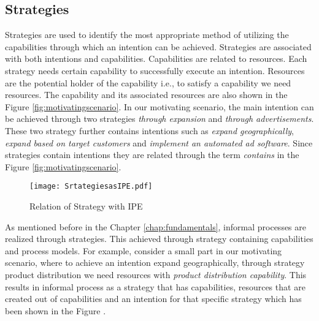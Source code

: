 \subsection{Strategies} 
\label{sec:strategies}
Strategies are used to identify the most appropriate method of utilizing the capabilities through which an intention can be achieved. Strategies are associated with both intentions and capabilities. Capabilities are related to resources. Each strategy needs certain capability to successfully execute an intention. Resources are the potential holder of the capability i.e., to satisfy a capability we need resources. The capability and its associated resources are also shown in the Figure \ref{fig:motivatingscenario}. In our motivating scenario, the main intention can be achieved through two strategies \textit{through expansion} and \textit{through advertisements}. These two strategy further contains intentions such as \textit{expand geographically}, \textit{expand based on target customers} and \textit{implement an automated ad software}. Since strategies contain intentions they are related through the term \textit{contains} in the Figure \ref{fig:motivatingscenario}.

\begin{figure}
	\centering
	\texttt{[image: SrtategiesasIPE.pdf]}
	\caption{Relation of Strategy with IPE}
	\label{fig:strategiesasIPE}
\end{figure}


As mentioned before in the Chapter \ref{chap:fundamentals}, informal processes are realized through strategies. This achieved through strategy containing capabilities and process models. For example, consider a small part in our motivating scenario, where to achieve an intention expand geographically, through strategy product distribution we need resources with \textit{product distribution capability}. This results in informal process as a strategy that has capabilities, resources that are created out of capabilities and an intention for that specific strategy which has been shown in the Figure .

